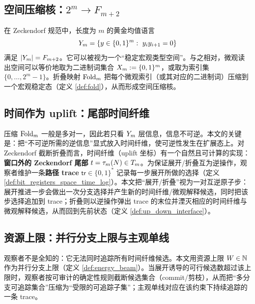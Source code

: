 \subsection{空间压缩核：\texorpdfstring{$2^m\to F_{m+2}$}{2^m->F_{m+2}}}
在 Zeckendorf 规范中，长度为 \(m\) 的黄金均值语言
\[
Y_m=\{y\in\{0,1\}^m:\ y_i y_{i+1}=0\}
\]
满足 \(|Y_m|=F_{m+2}\)。它可以被视为一个“稳定宏观类型空间”。与之相对，微观读出空间可以等价地取为二进制词集合 \(X_m:=\{0,1\}^m\)，或取为索引集 \(\{0,\dots,2^m-1\}\)。折叠映射 \(\mathrm{Fold}_m\) 把每个微观索引（或其对应的二进制词）压缩到一个宏观稳定态（定义 \ref{def:fold}），从而形成空间压缩核。

\subsection{时间作为 uplift：尾部时间纤维}
压缩 \(\mathrm{Fold}_m\) 一般是多对一，因此若只看 \(Y_m\) 层信息，信息不可逆。本文的关键是：把“不可逆所需的逆信息”显式放入时间纤维，使可逆性发生在扩展态上。对 Zeckendorf 截断折叠而言，时间纤维（uplift 坐标）有一个自然且可计算的实现：\textbf{窗口外的 Zeckendorf 尾部} \(t=\tau_m(N)\in T_m\)。为保证展开/折叠互为逆操作，观察者维护一条\textbf{路径 trace} \(\mathsf{tr}\in\{0,1\}^\ast\) 记录每一步展开所做的选择（定义 \ref{def:bit_registers_space_time_log}）。本文把“展开/折叠”视为一对互逆原子步：展开推进一步会做出一次分支选择并产生新的时间纤维/微观解释候选，同时把该步选择追加到 trace；折叠则以逆操作弹出 trace 的末位并湮灭相应的时间纤维与微观解释候选，从而回到先前状态（定义 \ref{def:up_down_interface}）。

\subsection{资源上限：并行分支上限与主观单线}
观察者不是全知的：它无法同时追踪所有时间纤维候选。本文用资源上限 \(W\in\mathbb{N}\) 作为并行分支上限（定义 \ref{def:energy_beam}）。当展开诱导的可行候选数超过该上限时，观察者按可审计的确定性规则截断候选集合（commit/剪枝），从而把“多分支可追踪集合”压缩为“受限的可追踪子集”；主观单线对应在该约束下持续追踪的一条 trace。

